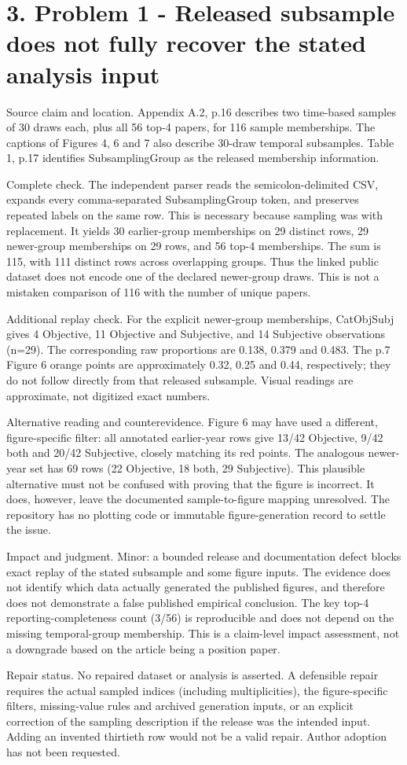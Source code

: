 \documentclass[10pt]{article}
\begin{document}
\section*{3. Problem 1 - Released subsample does not fully recover the stated analysis input}
Source claim and location. Appendix A.2, p.16 describes two time-based samples of 30 draws each, plus all 56 top-4 papers, for 116 sample memberships. The captions of Figures 4, 6 and 7 also describe 30-draw temporal subsamples. Table 1, p.17 identifies SubsamplingGroup as the released membership information.\par
Complete check. The independent parser reads the semicolon-delimited CSV, expands every comma-separated SubsamplingGroup token, and preserves repeated labels on the same row. This is necessary because sampling was with replacement. It yields 30 earlier-group memberships on 29 distinct rows, 29 newer-group memberships on 29 rows, and 56 top-4 memberships. The sum is 115, with 111 distinct rows across overlapping groups. Thus the linked public dataset does not encode one of the declared newer-group draws. This is not a mistaken comparison of 116 with the number of unique papers.\par
Additional replay check. For the explicit newer-group memberships, CatObjSubj gives 4 Objective, 11 Objective and Subjective, and 14 Subjective observations (n=29). The corresponding raw proportions are 0.138, 0.379 and 0.483. The p.7 Figure 6 orange points are approximately 0.32, 0.25 and 0.44, respectively; they do not follow directly from that released subsample. Visual readings are approximate, not digitized exact numbers.\par
Alternative reading and counterevidence. Figure 6 may have used a different, figure-specific filter: all annotated earlier-year rows give 13/42 Objective, 9/42 both and 20/42 Subjective, closely matching its red points. The analogous newer-year set has 69 rows (22 Objective, 18 both, 29 Subjective). This plausible alternative must not be confused with proving that the figure is incorrect. It does, however, leave the documented sample-to-figure mapping unresolved. The repository has no plotting code or immutable figure-generation record to settle the issue.\par
Impact and judgment. Minor: a bounded release and documentation defect blocks exact replay of the stated subsample and some figure inputs. The evidence does not identify which data actually generated the published figures, and therefore does not demonstrate a false published empirical conclusion. The key top-4 reporting-completeness count (3/56) is reproducible and does not depend on the missing temporal-group membership. This is a claim-level impact assessment, not a downgrade based on the article being a position paper.\par
Repair status. No repaired dataset or analysis is asserted. A defensible repair requires the actual sampled indices (including multiplicities), the figure-specific filters, missing-value rules and archived generation inputs, or an explicit correction of the sampling description if the release was the intended input. Adding an invented thirtieth row would not be a valid repair. Author adoption has not been requested.\par
\end{document}
